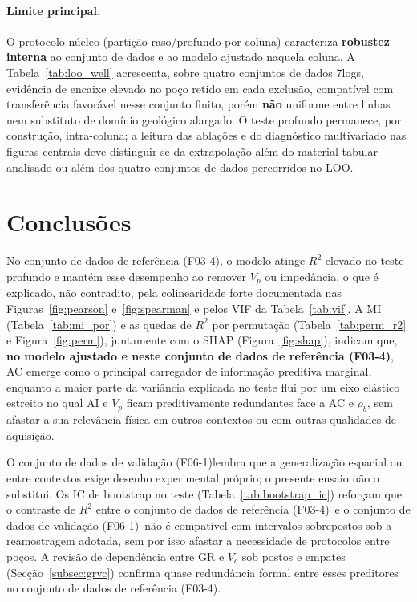 \documentclass[12pt,a4paper]{article}
\newcommand{\dadosref}{conjunto de dados de referência (F03-4)}
\newcommand{\dadosval}{conjunto de dados de validação (F06-1)}
\begin{document}
\paragraph{Limite principal.}
O protocolo núcleo (partição raso/profundo por coluna) caracteriza \textbf{robustez interna}
ao conjunto de dados e ao modelo ajustado naquela coluna. A Tabela~\ref{tab:loo_well} acrescenta,
sobre quatro conjuntos de dados 7logs, evidência de encaixe elevado no poço retido em cada exclusão,
compatível com transferência favorável nesse conjunto finito, porém \textbf{não} uniforme
entre linhas nem substituto de domínio geológico alargado. O teste profundo permanece,
por construção, intra-coluna; a leitura das ablações e do diagnóstico multivariado nas
figuras centrais deve distinguir-se da extrapolação além do material tabular analisado
ou além dos quatro conjuntos de dados percorridos no LOO.

\section{Conclusões}\label{sec:conclusoes}

No \dadosref, o modelo atinge \(R^2\) elevado no teste profundo e mantém
esse desempenho ao remover \(V_p\) ou impedância, o que é explicado, não
contradito, pela colinearidade forte documentada nas Figuras~\ref{fig:pearson}
e~\ref{fig:spearman} e pelos VIF da Tabela~\ref{tab:vif}. A MI (Tabela~\ref{tab:mi_por})
e as quedas de \(R^2\) por permutação (Tabela~\ref{tab:perm_r2} e
Figura~\ref{fig:perm}), juntamente com o SHAP (Figura~\ref{fig:shap}), indicam que,
\textbf{no modelo ajustado e neste \dadosref}, AC emerge como o principal carregador de
informação preditiva marginal, enquanto a maior parte da variância explicada no
teste flui por um eixo elástico estreito no qual AI e \(V_p\) ficam preditivamente
redundantes face a AC e \(\rho_b\), sem afastar a sua relevância física em outros
contextos ou com outras qualidades de aquisição.

O \dadosval lembra que a generalização espacial ou entre contextos
exige desenho experimental próprio; o presente ensaio não o substitui. Os IC de
bootstrap no teste (Tabela~\ref{tab:bootstrap_ic}) reforçam que o contraste de
\(R^2\) entre o \dadosref\ e o \dadosval\ não é compatível com intervalos sobrepostos sob a
reamostragem adotada, sem por isso afastar a necessidade de protocolos entre poços.
A revisão de dependência entre GR e \(V_c\) sob postos e empates
(Secção~\ref{subsec:grvc}) confirma quase redundância formal entre esses
preditores no \dadosref.
\end{document}
